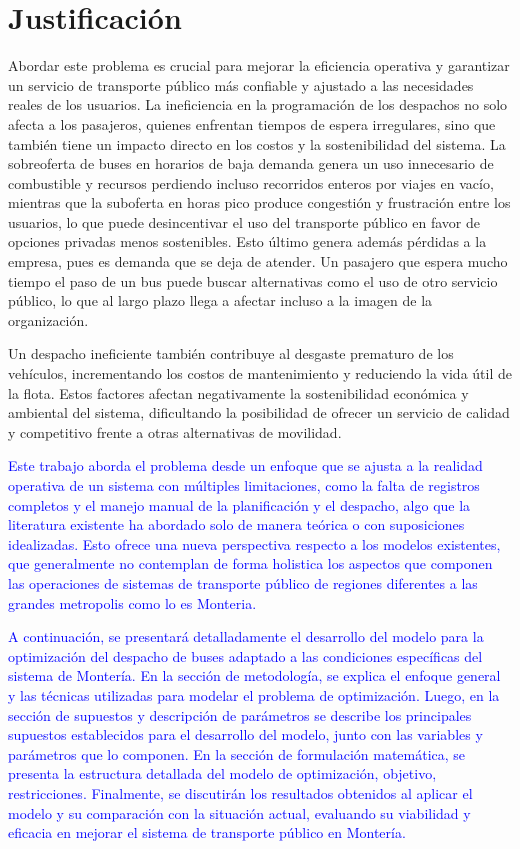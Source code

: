 \documentclass[preprint,11pt]{elsarticle}
\newcommand{\Blue}[1]{\textcolor{blue}{#1}}
\begin{document}
\section{Justificación}
Abordar este problema es crucial para mejorar la eficiencia operativa y garantizar un servicio de transporte público más confiable y ajustado a las necesidades reales de los usuarios. La ineficiencia en la programación de los despachos no solo afecta a los pasajeros, quienes enfrentan tiempos de espera irregulares, sino que también tiene un impacto directo en los costos y la sostenibilidad del sistema. La sobreoferta de buses en horarios de baja demanda genera un uso innecesario de combustible y recursos perdiendo incluso recorridos enteros por viajes en vacío, mientras que la suboferta en horas pico produce congestión y frustración entre los usuarios, lo que puede desincentivar el uso del transporte público en favor de opciones privadas menos sostenibles. Esto último genera además pérdidas a la empresa, pues es demanda que se deja de atender. Un pasajero que espera mucho tiempo el paso de un bus puede buscar alternativas como el uso de otro servicio público, lo que al largo plazo llega a afectar incluso a la imagen de la organización.

Un despacho ineficiente también contribuye al desgaste prematuro de los vehículos, incrementando los costos de mantenimiento y reduciendo la vida útil de la flota. Estos factores afectan negativamente la sostenibilidad económica y ambiental del sistema, dificultando la posibilidad de ofrecer un servicio de calidad y competitivo frente a otras alternativas de movilidad.

 \Blue{Este trabajo aborda el problema desde un enfoque que se ajusta a la realidad operativa de un sistema con múltiples limitaciones, como la falta de registros completos y el manejo manual de la planificación y el despacho, algo que la literatura existente ha abordado solo de manera teórica o con suposiciones idealizadas. Esto ofrece una nueva perspectiva respecto a los modelos existentes, que generalmente no contemplan de forma holistica los aspectos que componen las operaciones de sistemas de transporte público de regiones diferentes a las grandes metropolis como lo es Monteria.}

\Blue{A continuación, se presentará detalladamente el desarrollo del modelo para la optimización del despacho de buses adaptado a las condiciones específicas del sistema de Montería. En la sección de metodología, se explica el enfoque general y las técnicas utilizadas para modelar el problema de optimización. Luego, en la sección de supuestos y descripción de parámetros se describe los principales supuestos establecidos para el desarrollo del modelo, junto con las variables y parámetros que lo componen. En la sección de formulación matemática, se presenta la estructura detallada del modelo de optimización, objetivo, restricciones. Finalmente, se discutirán los resultados obtenidos al aplicar el modelo y su comparación con la situación actual, evaluando su viabilidad y eficacia en mejorar el sistema de transporte público en Montería.}
\end{document}
